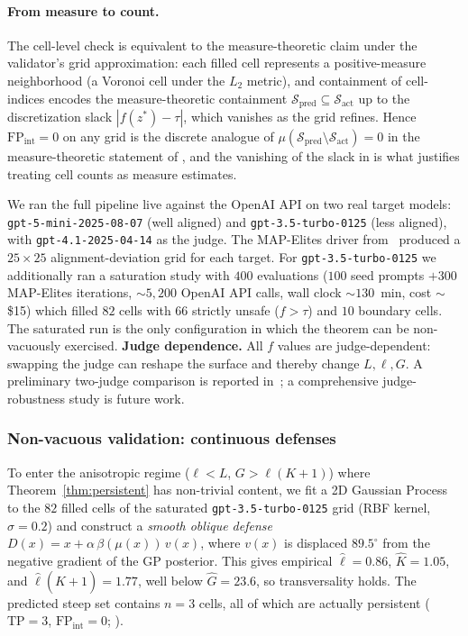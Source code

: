 \documentclass[11pt]{article}
\begin{document}
\paragraph{From measure to count.}
The cell-level check is equivalent to the measure-theoretic claim
under the validator's grid approximation: each filled cell represents
a positive-measure neighborhood (a Voronoi cell under the $L_2$
metric), and containment of cell-indices encodes the measure-theoretic
containment $\mathcal{S}_{\text{pred}} \subseteq
\mathcal{S}_{\text{act}}$ up to the discretization slack $|f(z^*) -
\tau|$, which vanishes as the grid refines. Hence
$\mathrm{FP}_{\mathrm{int}} = 0$ on any grid is the discrete analogue
of $\mu(\mathcal{S}_{\text{pred}} \setminus \mathcal{S}_{\text{act}})
= 0$ in the measure-theoretic statement of
, and the vanishing of the slack in
 is what justifies treating cell counts as
measure estimates.

We ran the full pipeline live against the OpenAI API on two real
target models: \texttt{gpt-5-mini-2025-08-07} (well aligned) and
\texttt{gpt-3.5-turbo-0125} (less aligned), with
\texttt{gpt-4.1-2025-04-14} as the judge. The MAP-Elites driver
from~\cite{munshi2026manifold} produced a $25 \times 25$
alignment-deviation grid for each target. For
\texttt{gpt-3.5-turbo-0125} we additionally ran a saturation study
with $400$ evaluations ($100$ seed prompts $+ 300$ MAP-Elites
iterations, $\sim$$5{,}200$ OpenAI API calls, wall clock
$\sim$$130$~min, cost $\sim$\$15) which filled $82$ cells with
$66$ strictly unsafe ($f > \tau$) and $10$ boundary cells. The
saturated run is the only configuration in which the theorem can be
non-vacuously exercised. \textbf{Judge dependence.}
All $f$ values are judge-dependent: swapping the judge can
reshape the surface and thereby change $L, \ell, G$. A
preliminary two-judge comparison is reported
in~; a comprehensive judge-robustness
study is future work.

\subsubsection{Non-vacuous validation: continuous defenses}
\label{sec:gp-instance}

To enter the anisotropic regime
($\ell < L$, $G > \ell(K{+}1)$) where Theorem~\ref{thm:persistent}
has non-trivial content, we fit a 2D Gaussian Process to the
$82$ filled cells of the saturated \texttt{gpt-3.5-turbo-0125}
grid (RBF kernel, $\sigma = 0.2$) and construct a
\emph{smooth oblique defense}
$D(x) = x + \alpha\,\beta(\mu(x))\,v(x)$, where $v(x)$ is displaced
$89.5^{\circ}$ from the negative gradient of the GP posterior. This
gives empirical $\hat\ell = 0.86$, $\hat K = 1.05$, and
$\hat\ell(\hat K{+}1) = 1.77$, well below $\hat G = 23.6$, so
transversality holds. The predicted steep set contains
$n = 3$ cells, all of which are actually persistent
($\mathrm{TP} = 3$, $\mathrm{FP}_{\mathrm{int}} = 0$;
).
\end{document}
